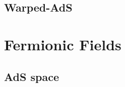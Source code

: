 \documentclass[12pt,a4paper]{article}
\begin{document}
\subsection{Warped-AdS}

\section{Fermionic Fields}

\subsection{AdS space}

\end{document}
